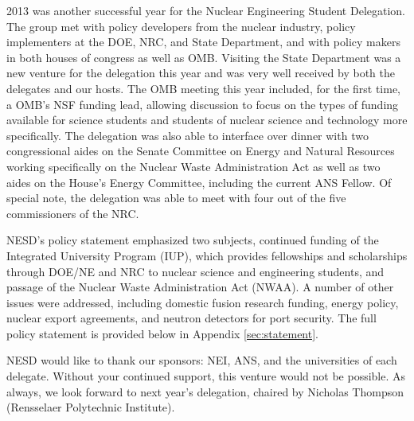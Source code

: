 

2013 was another successful year for the Nuclear Engineering Student
Delegation. The group met with policy developers from the nuclear industry,
policy implementers at the DOE, NRC, and State Department, and with policy
makers in both houses of congress as well as OMB. Visiting the State Department
was a new venture for the delegation this year and was very well received by
both the delegates and our hosts. The OMB meeting this year included, for the
first time, a OMB's NSF funding lead, allowing discussion to focus on the types
of funding available for science students and students of nuclear science and
technology more specifically. The delegation was also able to interface over
dinner with two congressional aides on the Senate Committee on Energy and
Natural Resources working specifically on the Nuclear Waste Administration Act
as well as two aides on the House's Energy Committee, including the current ANS
Fellow. Of special note, the delegation was able to meet with four out of the
five commissioners of the NRC.

NESD's policy statement emphasized two subjects, continued funding of the
Integrated University Program (IUP), which provides fellowships and scholarships
through DOE/NE and NRC to nuclear science and engineering students, and passage
of the Nuclear Waste Administration Act (NWAA). A number of other issues were
addressed, including domestic fusion research funding, energy policy, nuclear
export agreements, and neutron detectors for port security. The full policy
statement is provided below in Appendix \ref{sec:statement}.

NESD would like to thank our sponsors: NEI, ANS, and the universities of each
delegate. Without your continued support, this venture would not be possible. As
always, we look forward to next year's delegation, chaired by Nicholas Thompson
(Rensselaer Polytechnic Institute).
